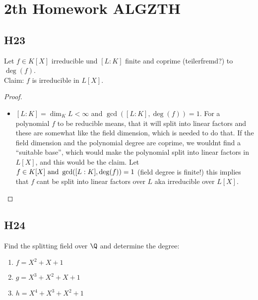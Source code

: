 
\section{2th Homework ALGZTH}
\subsection{H23}
Let $f \in K[X]$ irreducible und $[L:K]$ finite and coprime (teilerfremd?) to $\deg(f)$.\\
Claim: $f$ is irreducible in $L[X]$.

\begin{proof}
	\begin{itemize}
		\item $[L:K] = \dim_K L < \infty$ and $\gcd([L:K], \deg(f)) =1$. For a polynomial $f$ to be reducible means, that it will split into linear factors and these are somewhat like the field dimension, which is needed to do that. If the field dimension and the polynomial degree are coprime, we wouldnt find a ``suitable base'', which would make the polynomial split into linear factors in $L[X]$, and this would be the claim.
		Let $f \in K[X] \text{ and } \gcd([L:K], \deg(f)) = 1$ (field degree is finite!) this implies that $f$ cant be split into linear factors over $L$ aka irreducible over $L[X]$.
	\end{itemize}
\end{proof}

\subsection{H24}
Find the splitting field over $\Q$ and determine the degree: 
\begin{enumerate}
	\item $f = X^2 + X +1$
	\item $g = X^3 + X^2 + X + 1$
	\item $h = X^4 + X^3 + X^2 + 1$
\end{enumerate}

